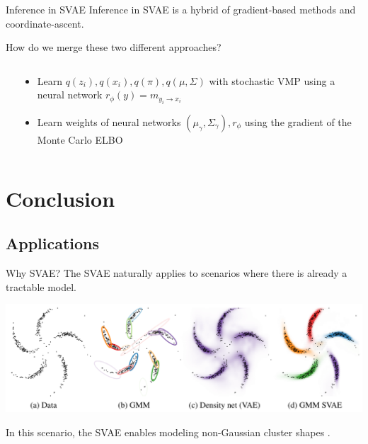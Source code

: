 \documentclass[10pt, compress]{beamer}
\begin{document}
\begin{frame}{Inference in SVAE}
  Inference in SVAE is a hybrid of gradient-based methods and
  coordinate-ascent.

  \pause

  How do we merge these two different approaches?
  \pause
  \begin{columns}
    \begin{column}{0.25\textwidth}
      \centering
      
    \end{column}
    \begin{column}{0.75\textwidth}
      \begin{itemize}
          \pause
        \item Learn $q(z_i), q(x_i), q(\pi), q(\mu, \Sigma)$ with stochastic VMP using a neural network 
          $r_\phi(y) = m_{y_i \rightarrow x_i}$
          \pause
        \item Learn weights of neural networks $(\mu_\gamma, \Sigma_\gamma), r_\phi$ using the gradient of the Monte Carlo ELBO
      \end{itemize}
    \end{column}
  \end{columns}
\end{frame}

\section{Conclusion}

\subsection{Applications}
\begin{frame}{Why SVAE?}
  The SVAE naturally applies to scenarios where there is already a tractable model.

  \pause
  \begin{center}
    \includegraphics[frame,width=\textwidth]{img/svae-example}
  \end{center}

  \pause
  In this scenario, the SVAE enables modeling non-Gaussian cluster shapes \cite{svae}.
\end{frame}
\end{document}

